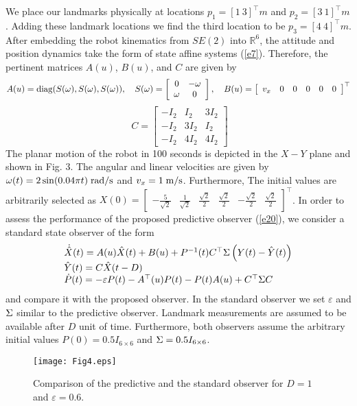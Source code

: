 \documentclass[12pt,draftcls,onecolumn]{IEEEtran}
\begin{document}
We place our landmarks physically at locations $ {p_1} = [1~3]^{\top}m$ and ${p_2} = [3~ 1]^{\top}m$. Adding these landmark locations we find the third location to be $ {p_3} = [4 ~ 4]^{\top}m$. After embedding the robot kinematics from $SE(2)$ into ${\mathbb R}^6$, the attitude and position dynamics take the form of state affine systems (\ref{e7}). Therefore, the pertinent matrices $A(u)$, $B(u)$, and $C$ are given by
$$A(u) = {\mathop{\rm diag}\nolimits} (S(\omega ),S(\omega ),S(\omega )), \quad S(\omega ) = \left[ {\begin{array}{*{20}{c}} 0&{ - \omega }\\ \omega &0 \end{array}} \right], \quad B(u) = {\left[ {\begin{array}{*{20}{c}}{{v_x}}&0&0&0&0&0 \end{array}} \right]^{\top} } $$ $$ \; C = \left[ {\begin{array}{*{20}{c}}
{ - {I_2}}&{{I_2}}&{3{I_2}}\\ { - {I_2}}&{3{I_2}}&{{I_2}}\\ { - {I_2}}&{4{I_2}}&{4{I_2}} \end{array}} \right] $$
The planar motion of the robot in 100 seconds is depicted in the $X-Y$ plane and shown in Fig. 3. The angular and linear velocities are given by $\omega (t) = 2\sin (0.04\pi t)\;{\rm{rad}}/{\rm{s}}$ and ${v_x} = 1\;{\rm{m}}/{\rm{s}} $. Furthermore, The initial values are arbitrarily selected as $ X(0) = {\left[ {\begin{array}{*{20}{c}}{ - \frac{5}{{\sqrt 2 }}}&{\frac{1}{{\sqrt 2 }}}&{\frac{{\sqrt 2 }}{2}}&{\frac{{\sqrt 2 }}{2}}&{ - \frac{{\sqrt 2 }}{2}}&{\frac{{\sqrt 2 }}{2}}\end{array}} \right]^{\top}}$. In order to assess the performance of the proposed predictive observer (\ref{e20}), we consider a standard state observer of the form \cite{c20}
\begin{equation}   \label{e21}
\begin{array}{l}
\dot{\hat {X}}(t) = A(u)\hat X(t) + B(u) + {P^{ - 1}}(t){C^{\top} }{\rm{\Sigma }}\left( {Y(t) - \hat Y(t)} \right)\\
\hat Y(t) = C\hat X(t - D)\\\dot P(t) =  - \varepsilon P(t) - {A^{\top} }(u)P(t) - P(t)A(u) + {C^{\top} }{\rm{\Sigma }}C
\end{array}
\end{equation}
and compare it with the proposed observer. In the standard observer we set $\varepsilon $ and ${\rm{\Sigma }}$ similar to the predictive observer. Landmark measurements are assumed to be available after $D$ unit of time. Furthermore, both observers assume the arbitrary initial values $P(0) = 0.5{I_{6 \times 6}}$ and ${\rm{\Sigma  = 0}}{\rm{.5}}{I_{6 \times 6}} $.
\begin{figure}[thpb] \label{F4}
\centering
\texttt{[image: Fig4.eps]}
\caption{Comparison of the predictive and the standard observer for $D=1$ and $ \varepsilon=0.6 $. }
\end{figure}
\end{document}
